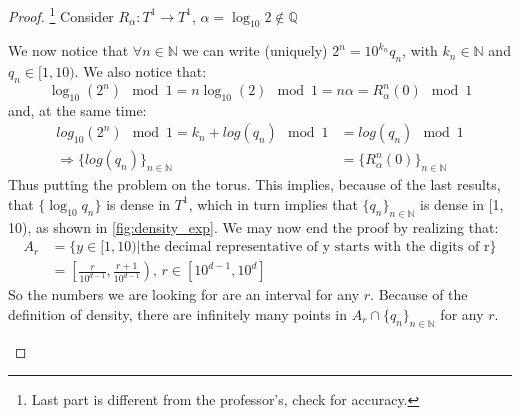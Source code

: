 \begin{proof} \footnote{Last part is different from the professor's, check for accuracy.}
    Consider $R_{\alpha}: T^1\rightarrow T^1$, $\alpha=\log_{10}2\notin \mathbb{Q}$

    We now notice that $\forall n\in\mathbb{N}$ we can write (uniquely) $2^n=10^{k_n}q_n$, with $k_n\in\mathbb{N}$ and $q_n\in[1,10)$. We also notice that: \begin{equation*}
        \log_{10}(2^n)\mod 1=n\log_{10}(2)\mod 1=n\alpha=R_{\alpha}^n(0) \mod 1
    \end{equation*}
    and, at the same time: \begin{align*}
        log_{10}(2^n) \mod 1=k_n+log(q_n) \mod 1&=log(q_n) \mod 1 \\\Rightarrow \{log(q_n)\}_{n\in\mathbb{N}}&=\{R_{\alpha}^n(0)\}_{n\in\mathbb{N}}
    \end{align*}
    Thus putting the problem on the torus. This implies, because of the last results, that $\{\log_{10}q_n\}$ is dense in $T^1$, which in turn implies that $\{q_n\}_{n\in\mathbb{N}}$ is dense in [1, 10), as shown in \autoref{fig:density_exp}. We may now end the proof by realizing that: \begin{align*}
        A_r&=\{y\in[1, 10)| \text{the decimal representative of y starts with the digits of r}\} \\
        &=\left[\frac{r}{10^{d-1}}, \frac{r+1}{10^{d-1}}\right),\, r\in [10^{d-1}, 10^d]
    \end{align*}
    So the numbers we are looking for are an interval for any $r$. Because of the definition of density, there are infinitely many points in $A_r\cap\{q_n\}_{n\in\mathbb{N}}$ for any $r$.

    \begin{figure}[ht]
    \centering
\end{figure}
\end{proof}
